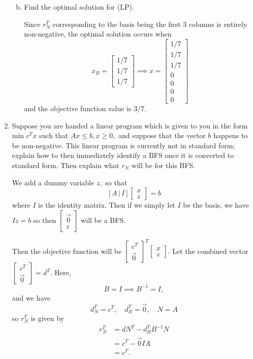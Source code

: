 \documentclass{article}
\begin{document}
\begin{enumerate}
\begin{enumerate}[a)]
\begin{soln}
				\end{soln}

			\item Find the optimal solution for (LP).
				\begin{soln}
					Since $r_N^T$ corresponding to the basis being the first 3 columns is entirely non-negative, the optimal solution occurs when \[x_B=\begin{bmatrix}
						1/7 \\ 1/7 \\ 1/7
					\end{bmatrix} \implies x=\begin{bmatrix}
					1/7 \\ 1/7 \\ 1/7 \\ 0 \\ 0 \\ 0 \\ 0
			\end{bmatrix} \] and the objective function value is $3/7.$

				\end{soln}
				
		\end{enumerate}

	\item Suppose you are handed a linear program which is given to you in the form min $c^T x$ such that $Ax\le b, x\ge 0,$ and suppose that the vector $b$ happens to be non-negative. This linear program is currently not in standard form; explain how to then immediately identify a BFS once it is converted to standard form. Then explain what $r_N$ will be for this BFS.
		\begin{soln}
			We add a dummy variable $z,$ so that \[ [A\, |\, I] \begin{bmatrix}
				x \\ z
		\end{bmatrix} = b\] where $I$ is the identity matrix. Then if we simply let $I$ be the basis, we have $Iz=b$ so then $\begin{bmatrix}
			\vec{0} \\ z
		\end{bmatrix}$ will be a BFS. 

		Then the objective function will be $\begin{bmatrix}
			c^T \\ \vec{0}
		\end{bmatrix}^T\begin{bmatrix}
			x \\ z
		\end{bmatrix}.$ Let the combined vector $\begin{bmatrix}
			c^T \\ \vec{0}
		\end{bmatrix}=d^T.$ Here, \[B=I\implies B^{-1}=I, \] and we have \[d_N^T = c^T, \quad d_B^T = \vec{0}, \quad N=A\]
		so $r_N^T$ is given by 
		\begin{align*}
			r_N^T &= dN^T - d_B^T B^{-1}N \\
			&= c^T-\vec{0}IA \\
			&= c^T.
		\end{align*}


\end{soln}
\end{enumerate}
\end{document}
